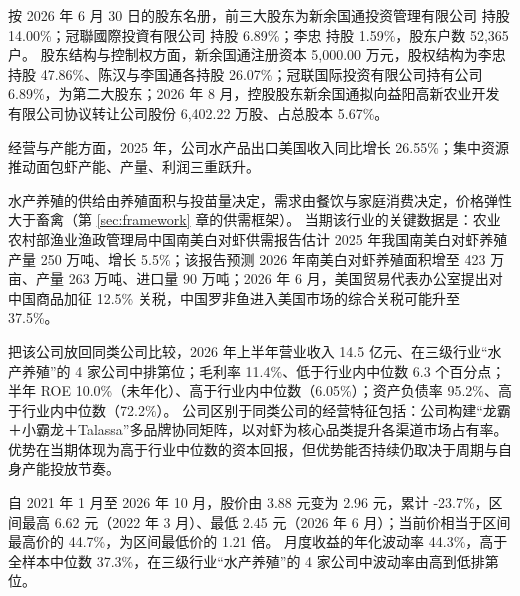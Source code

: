  按 2026 年 6 月 30 日的股东名册，前三大股东为新余国通投资管理有限公司 持股 14.00\%；冠聯國際投資有限公司 持股 6.89\%；李忠 持股 1.59\%，股东户数 52,365 户。 股东结构与控制权方面，新余国通注册资本 5,000.00 万元，股权结构为李忠持股 47.86\%、陈汉与李国通各持股 26.07\%；冠联国际投资有限公司持有公司 6.89\%，为第二大股东；2026 年 8 月，控股股东新余国通拟向益阳高新农业开发有限公司协议转让公司股份 6,402.22 万股、占总股本 5.67\%。

 经营与产能方面，2025 年，公司水产品出口美国收入同比增长 26.55\%；集中资源推动面包虾产能、产量、利润三重跃升。

 水产养殖的供给由养殖面积与投苗量决定，需求由餐饮与家庭消费决定，价格弹性大于畜禽（第 \ref{sec:framework} 章的供需框架）。 当期该行业的关键数据是：农业农村部渔业渔政管理局中国南美白对虾供需报告估计 2025 年我国南美白对虾养殖产量 250 万吨、增长 5.5\%；该报告预测 2026 年南美白对虾养殖面积增至 423 万亩、产量 263 万吨、进口量 90 万吨；2026 年 6 月，美国贸易代表办公室提出对中国商品加征 12.5\% 关税，中国罗非鱼进入美国市场的综合关税可能升至 37.5\%。

 把该公司放回同类公司比较，2026 年上半年营业收入 14.5 亿元、在三级行业“水产养殖”的 4 家公司中排第位；毛利率 11.4\%、低于行业内中位数 6.3 个百分点；半年 ROE 10.0\%（未年化）、高于行业内中位数（6.05\%）；资产负债率 95.2\%、高于行业内中位数（72.2\%）。 公司区别于同类公司的经营特征包括：公司构建“龙霸＋小霸龙＋Talassa”多品牌协同矩阵，以对虾为核心品类提升各渠道市场占有率。 优势在当期体现为高于行业中位数的资本回报，但优势能否持续仍取决于周期与自身产能投放节奏。

 自 2021 年 1 月至 2026 年 10 月，股价由 3.88 元变为 2.96 元，累计 -23.7\%，区间最高 6.62 元（2022 年 3 月）、最低 2.45 元（2026 年 6 月）；当前价相当于区间最高价的 44.7\%，为区间最低价的 1.21 倍。 月度收益的年化波动率 44.3\%，高于全样本中位数 37.3\%，在三级行业“水产养殖”的 4 家公司中波动率由高到低排第位。

